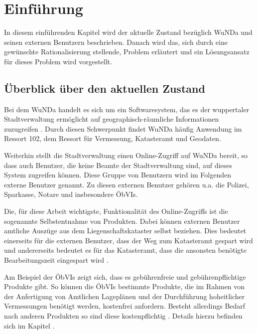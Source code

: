 \chapter{Einführung}
In diesem einführenden Kapitel wird der aktuelle Zustand bezüglich \acs{WuNDa} und seinen externen Benutzern beschrieben. Danach wird das, sich durch eine gewünschte Rationalisierung stellende, Problem erläutert und ein Lösungsansatz für dieses Problem wird vorgestellt.

\section{Überblick über den aktuellen Zustand}
Bei dem \ac{WuNDa} handelt es sich um ein Softwaresystem, das es der wuppertaler Stadtverwaltung ermöglicht auf geographisch-räumliche Informationen zuzugreifen \autocite[vgl.][]{cismet-wunda}. Durch diesen Schwerpunkt findet \ac{WuNDa} häufig Anwendung im Ressort 102, dem Ressort für Vermessung, Katasteramt und Geodaten.

Weiterhin stellt die Stadtverwaltung einen Online-Zugriff auf \ac{WuNDa} bereit, so dass auch Benutzer, die keine Beamte der Stadtverwaltung sind, auf dieses System zugreifen können. Diese Gruppe von Benutzern wird im Folgenden externe Benutzer genannt.
Zu diesen externen Benutzer gehören u.a. die Polizei, Sparkasse, Notare und insbesondere \acp{ÖbVI}.

Die, für diese Arbeit wichtigste, Funktionalität des Online-Zugriffs ist die sogenannte Selbstentnahme von Produkten. Dabei können externen Benutzer amtliche Auszüge aus dem Liegenschaftskataster selbst beziehen. Dies bedeutet einerseits für die externen Benutzer, dass der Weg zum Katasteramt gespart wird und andererseits bedeutet es für das Katasteramt, dass die ansonsten benötigte Bearbeitungszeit eingespart wird \autocite[vgl.][]{wupp-wunda}.

Am Beispiel der \acp{ÖbVI} zeigt sich, dass es gebührenfreie und gebührenpflichtige Produkte gibt.
So können die \acp{ÖbVI} bestimmte Produkte, die im Rahmen von der Anfertigung von Amtlichen Lageplänen und der Durchführung hoheitlicher Vermessungen benötigt werden, kostenfrei anfordern.
Besteht allerdings Bedarf nach anderen Produkten so sind diese kostenpflichtig \autocite[vgl.][]{wupp-wunda-oebvi}. Details hierzu befinden sich im Kapitel .

